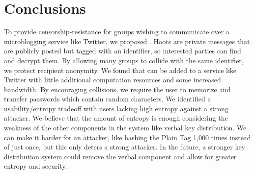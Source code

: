 \section{Conclusions}

To provide censorship-resistance for groups wishing to communicate over a microblogging service like Twitter, we proposed \hoot. Hoots are private messages that are publicly posted but tagged with an identifier, so interested parties can find and decrypt them. By allowing many groups to collide with the same identifier, we protect recipient anonymity. We found that \hoot can be added to a service like Twitter with little additional computation resources and some increased bandwidth. By encouraging collisions, we require the user to memorize and transfer passwords which contain random characters. We identified a usability/entropy tradeoff with users lacking high entropy against a strong attacker. We believe that the amount of entropy is enough considering the weakness of the other components in the system like verbal key distribution. We can make it harder for an attacker, like hashing the Plain Tag 1,000 times instead of just once, but this only deters a strong attacker. In the future, a stronger key distribution system could remove the verbal component and allow for greater entropy and security.